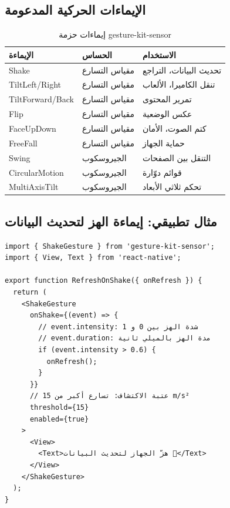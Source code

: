 \begin{Arabic}
\subsection{الإيماءات الحركية المدعومة}

\begin{table}[htbp]
\centering
\caption{إيماءات حزمة \textenglish{gesture-kit-sensor}}
\label{tab:sensor-gestures}
\begin{tabularx}{\textwidth}{XXX}
\toprule
\textbf{الإيماءة} & \textbf{الحساس} & \textbf{الاستخدام} \\
\midrule
\textenglish{Shake} & مقياس التسارع & تحديث البيانات، التراجع \\
\rowcolor{gray!10}
\textenglish{TiltLeft/Right} & مقياس التسارع & تنقل الكاميرا، الألعاب \\
\textenglish{TiltForward/Back} & مقياس التسارع & تمرير المحتوى \\
\rowcolor{gray!10}
\textenglish{Flip} & مقياس التسارع & عكس الوضعية \\
\textenglish{FaceUpDown} & مقياس التسارع & كتم الصوت، الأمان \\
\rowcolor{gray!10}
\textenglish{FreeFall} & مقياس التسارع & حماية الجهاز \\
\textenglish{Swing} & الجيروسكوب & التنقل بين الصفحات \\
\rowcolor{gray!10}
\textenglish{CircularMotion} & الجيروسكوب & قوائم دوّارة \\
\textenglish{MultiAxisTilt} & الجيروسكوب & تحكم ثلاثي الأبعاد \\
\bottomrule
\end{tabularx}
\end{table}

\subsection{مثال تطبيقي: إيماءة الهز لتحديث البيانات}

\begin{english}
\begin{verbatim}
import { ShakeGesture } from 'gesture-kit-sensor';
import { View, Text } from 'react-native';

export function RefreshOnShake({ onRefresh }) {
  return (
    <ShakeGesture
      onShake={(event) => {
        // event.intensity: شدة الهز بين 0 و 1
        // event.duration: مدة الهز بالميلي ثانية
        if (event.intensity > 0.6) {
          onRefresh();
        }
      }}
      // عتبة الاكتشاف: تسارع أكبر من 15 m/s²
      threshold={15}
      enabled={true}
    >
      <View>
        <Text>هزّ الجهاز لتحديث البيانات 🔄</Text>
      </View>
    </ShakeGesture>
  );
}
\end{verbatim}
\end{english}


\end{Arabic}

